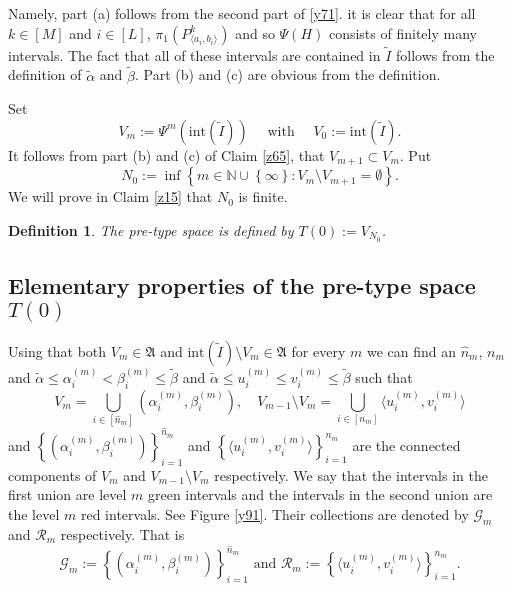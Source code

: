 \documentclass[amssymb,amsfonts,12pt,verbatim,righttag,oneside]{amsart}
\numberwithin{equation}{section} %
\theoremstyle{plain}
\theoremstyle{plain}
\newtheorem{definition}[theorem]{Definition}
\begin{document}
Namely, part (a) follows from the second part of  \eqref{y71}.
it is clear that for all $k\in[M]$ and $i\in[L]$,  $\pi _1 \left( P_{\langle a_i,b_i\rangle}^k \right)$ and so
$\Psi (H)$ consists of finitely many intervals.
The fact that all of these intervals are contained in $\widetilde{I}$
follows from the definition of $\widetilde{\alpha }$ and $\widetilde{\beta }$.
Part (b) and (c) are obvious from the definition.

Set
\begin{equation}
\label{z66}
V_m:=\Psi^{m} (\mathrm{int} (\widetilde{I}))\quad \text{ with }\quad
V_0:=\mathrm{int}( \widetilde{I}).
\end{equation}
  {It follows from}
 part (b) {and (c)} of Claim \ref{z65}, {that}  $V_{m+1}\subset  V_{m}$. Put
\begin{equation}
\label{z49}
N_0:=
\inf\left\{ m\in\mathbb{N}\cup\left\{ \infty   \right\}:
V_{m}\setminus V_{m+1}=\emptyset
\right\}.
\end{equation}
We will prove in Claim \ref{z15} that $N_0$ is finite.
\begin{definition}\label{z63}
  The pre-type space is defined by $T(0):=V_{N_0}$.
\end{definition}

\subsection{Elementary properties of the pre-type space $T(0)$}

Using that both $V_m\in \mathfrak{A}
$ and $\mathrm{int}(\widetilde{   I})\setminus V_m \in \mathfrak{A}$
for every $m$ we can find
 an $\widehat{n}_m$, $n_m$ and $\widetilde{\alpha }\leq \alpha _{i}^{(m) }<\beta  _{i}^{(m) }\leq\widetilde{\beta }$ and $\widetilde{\alpha }\leq
u_i^{(m)}\leq v_i^{(m)}
 \leq\widetilde{\beta }
 $ such that
$$
V_m= \bigcup\limits_{i\in [\widehat{n}_m]}
\left( \alpha _{i}^{(m) },\beta  _{i}^{(m) } \right) ,\quad
V_{m-1}\setminus V_m
=
\bigcup\limits_{i\in [n_m]}
\langle  u_i^{(m)}, v_i^{(m)}  \rangle
$$
and $\left\{\left( \alpha _{i}^{(m) },\beta  _{i}^{(m) } \right)  \right\}
_{i=1}^{\widehat{n}_m }$ and
$
\left\{
  \langle  u_i^{(m)}, v_i^{(m)}  \rangle
 \right\}_{i=1}^{n_m }
$
are the connected components of $V_m$ and
$V_{m-1}\setminus V_m$ respectively.
We say that the intervals in the first union are level $m$
green intervals and the intervals in the second union are the level $m$ red intervals.
See Figure \ref{y91}.
Their  collections  are denoted  by $\mathcal{G}_m$ and $\mathcal{R}_m$ respectively. That is
$$
\mathcal{G}_m:=\left\{
   \left(\alpha _i^{(m)}, \beta _i^{(m)}  \right)
 \right\}_{ i=1}^{\widehat{n}_m }
\text{ and }
\mathcal{R}_m:=\left\{ \langle  u_i^{(m)}, v_i^{(m)}
  \rangle \right\}_{ i=1}^{n_m }.
$$
\end{document}
